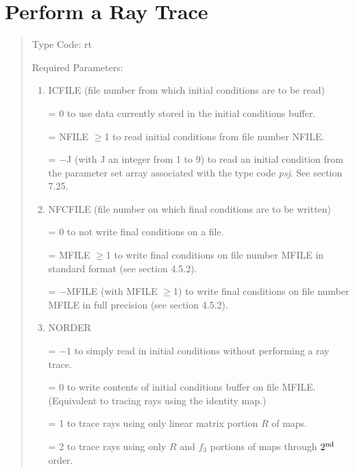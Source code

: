 \section{Perform a Ray Trace}
\begin{quotation}
\noindent Type Code:  rt
\vspace{5mm}

\noindent Required Parameters:
\begin{enumerate}
      \item  ICFILE (file number from which initial conditions are to be read)

             = 0 to use data currently stored in the initial conditions buffer.

             = NFILE $\geq$1 to read initial conditions from file number NFILE.

             = $-$J (with J an integer from 1 to 9) to read an initial
               condition from the \hspace*{1em}parameter set array associated with
               the type code {\em psj}.  See section 7.25.

      \item  NFCFILE (file number on which final conditions are to be written)

= 0 to not write final conditions on a file.

             = MFILE $\geq$1 to write final conditions on file number
               MFILE in standard \hspace*{1em}format (see section 4.5.2).

             = $-$MFILE (with MFILE $\geq$1) to write final conditions on
               file number \hspace*{1em}MFILE in full precision (see section 4.5.2).
      \item  NORDER

             = $-1$ to simply read in initial conditions without performing
               a ray trace.

             = 0 to write contents of initial conditions buffer on file
               MFILE.  (Equivalent \hspace*{1em}to tracing rays using the identity
               map.)

             = 1 to trace rays using only linear matrix portion $R$ of maps.

             = 2 to trace rays using only $R$ and $f_3$ portions of maps
			   through $2^{\mbox{\scriptsize nd}}$ order.


\end{enumerate}
\end{quotation}

